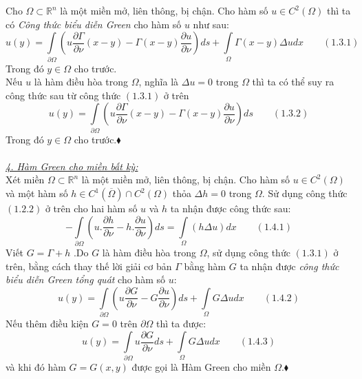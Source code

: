 Cho $\Omega  \subset \mathbb{R}^n 
$ là một miền mở, liên thông, bị chận. Cho hàm số $
u \in C^2 \left( \Omega  \right)
$ thì ta có {\it Công thức biểu diễn Green} cho hàm số $u$ như sau:
\[
u\left( y \right) = \int\limits_{\partial \Omega } {\left( {u\frac{{\partial \Gamma }}
{{\partial \nu }}\left( {x - y} \right) - \Gamma \left( {x - y} \right)\frac{{\partial u}}
{{\partial \nu }}} \right)ds}  + \int\limits_\Omega  {\Gamma \left( {x - y} \right)\Delta udx} \quad \quad \left( {1.3.1} \right)
\]
Trong đó $
y \in \Omega 
$ cho trước.\\
Nếu $u$ là hàm điều hòa trong $\Omega$, nghĩa là $
\Delta u = 0
$ trong $\Omega$ thì ta có thể suy ra công thức sau từ công thức $
\left( {1.3.1} \right)
$ ở trên
\[
u\left( y \right) = \int\limits_{\partial \Omega } {\left( {u\frac{{\partial \Gamma }}
{{\partial \nu }}\left( {x - y} \right) - \Gamma \left( {x - y} \right)\frac{{\partial u}}
{{\partial \nu }}} \right)ds} \quad \quad \left( {1.3.2} \right)
\]
Trong đó $
y \in \Omega 
$ cho trước.$\blacklozenge$\\
\\ \textit{\underline{4. Hàm Green cho miền bất kỳ:} }\\
Xét miền $
\Omega  \subset \mathbb{R}^n 
$ là một miền mở, liên thông, bị chận. Cho hàm số $
u \in C^2 \left( \Omega  \right)
$ và một hàm số $
h \in C^1 \left( {\overline \Omega  } \right) \cap C^2 \left( \Omega  \right)
$ thỏa $
\Delta h = 0
$ trong $\Omega$. Sử dụng công thức $
\left( {1.2.2} \right)
$ ở trên cho hai hàm số $u$ và $h$ ta nhận được công thức sau:
\[
 - \int\limits_{\partial \Omega } {\left( {u.\frac{{\partial h}}
{{\partial \nu }} - h.\frac{{\partial u}}
{{\partial \nu }}} \right)ds}  = \int\limits_\Omega  {\left( {h\Delta u} \right)dx} \quad \quad \left( {1.4.1} \right)
\]
Viết $
G = \Gamma  + h
$ .Do $G$ là hàm điều hòa trong $\Omega$, sử dụng công thức $
\left( {1.3.1} \right)
$ ở trên, bằng cách thay thế lời giải cơ bản $
\Gamma 
$ bằng hàm $G$ ta nhận được {\it công thức biểu diễn Green tổng quát} cho hàm số $u$:
\[
u\left( y \right) = \int\limits_{\partial \Omega } {\left( {u\frac{{\partial G}}
{{\partial \nu }} - G\frac{{\partial u}}
{{\partial \nu }}} \right)ds}  + \int\limits_\Omega  {G\Delta udx} \quad \quad \left( {1.4.2} \right)
\]
Nếu thêm điều kiện $G=0$ trên $
\partial \Omega 
$ thì ta được:
\[
u\left( y \right) = \int\limits_{\partial \Omega } {u\frac{{\partial G}}
{{\partial \nu }}ds}  + \int\limits_\Omega  {G\Delta udx} \quad \quad \left( {1.4.3} \right)
\]
và khi đó hàm $
G = G\left( {x,y} \right)
$ được gọi là Hàm Green cho miền $\Omega$.$\blacklozenge$\\

